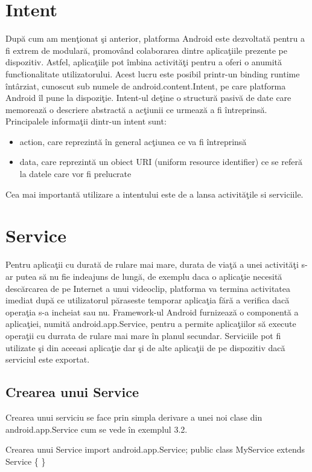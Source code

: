 \section{Intent}
Dup\u a cum am men\c tionat \c si anterior, platforma Android este dezvoltat\u a pentru a fi extrem de modular\u a, promov\^ and colaborarea dintre aplica\c tiile prezente pe dispozitiv. Astfel, aplica\c tiile pot \^imbina activit\u a\c ti pentru a oferi o anumit\u a func\u tionalitate utilizatorului. Acest lucru este posibil printr-un binding runtime \^int\^arziat, cunoscut sub numele de android.content.Intent, pe care platforma Android \^il pune la dispozi\c tie.\newline 
Intent-ul de\c tine o structur\u a pasiv\u a de date care memoreaz\u a o descriere abstract\u a a ac\c tiunii ce urmeaz\u a a fi \^intreprins\u a. Principalele informa\c tii dintr-un intent sunt:\newline 

\begin{itemize}
  \item action, care reprezint\u a \^in general ac\c tiunea ce va fi \^intreprins\u a
  \item data, care reprezint\u a un obiect URI (uniform resource identifier) ce se refer\u a la datele care vor fi prelucrate
\end{itemize}
Cea mai important\u a utilizare a intentului este de a lansa activit\u a\c tile si serviciile.

\section{Service}
Pentru aplica\c tii cu durat\u a de rulare mai mare, durata de via\c t\u a a unei activit\u a\c ti s-ar putea s\u a nu fie indeajuns de lung\u a, de exemplu daca o aplica\c tie necesit\u a desc\u arcarea de pe Internet a unui videoclip, platforma va termina activitatea imediat dup\u a ce utilizatorul p\u araseste temporar aplica\c tia fără a verifica dac\u a opera\c tia s-a incheiat sau nu.\newline 
Framework-ul Android furnizeaz\u a o component\u a a aplica\c tiei, numit\u a android.app.Service, pentru a permite aplica\c tiilor s\u a execute opera\c tii cu durrata de rulare mai mare \^in planul secundar.\newline 
Serviciile pot fi utilizate \c si din aceeasi aplica\c tie dar \c si de alte aplica\c tii  de pe dispozitiv dac\u a serviciul este exportat.\cite{1}


\subsection{Crearea unui Service}
Crearea unui serviciu se face prin simpla derivare a unei noi clase din android.app.Service cum se vede \^in exemplul 3.2.\cite{2}\newline 
\begin{exmp} Crearea unui Service
import android.app.Service;\newline 
public class MyService extends Service \{ \newline 
\} \end{exmp}

